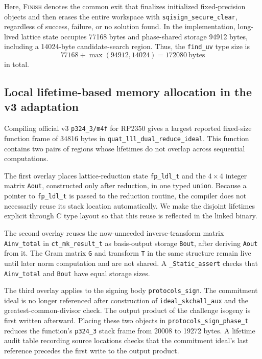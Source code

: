 \documentclass[a4paper,10pt]{article}
\theoremstyle{definition}
\theoremstyle{remark}
\begin{document}
Here, \textsc{Finish} denotes the common exit that finalizes initialized fixed-precision objects and then erases the entire workspace with \texttt{sqisign\_secure\_clear}, regardless of success, failure, or no solution found. In the implementation, long-lived lattice state occupies \num{77168} bytes and phase-shared storage \num{94912} bytes, including a \num{14024}-byte candidate-search region. Thus, the \texttt{find\_uv} type size is
\begin{equation}
  \num{77168}+\max(\num{94912},\num{14024})
  =\num{172080}\ \text{bytes}
  \label{eq:finduv-size}
\end{equation}
in total.

\subsection{Local lifetime-based memory allocation in the v3 adaptation}
\label{sec:v3-method}

Compiling official v3 \texttt{p324\_3/m4f} for RP2350 gives a largest reported fixed-size function frame of \num{34816} bytes in \texttt{quat\_lll\_dual\_reduce\_ideal}. This function contains two pairs of regions whose lifetimes do not overlap across sequential computations.

The first overlay places lattice-reduction state \texttt{fp\_ldl\_t} and the $4\times4$ integer matrix \texttt{Aout}, constructed only after reduction, in one typed \texttt{union}. Because a pointer to \texttt{fp\_ldl\_t} is passed to the reduction routine, the compiler does not necessarily reuse its stack location automatically. We make the disjoint lifetimes explicit through C type layout so that this reuse is reflected in the linked binary.

The second overlay reuses the now-unneeded inverse-transform matrix \texttt{Ainv\_total} in \texttt{ct\_mk\_result\_t} as basis-output storage \texttt{Bout}, after deriving \texttt{Aout} from it. The Gram matrix \texttt{G} and transform \texttt{T} in the same structure remain live until later norm computation and are not shared. A \texttt{\_Static\_assert} checks that \texttt{Ainv\_total} and \texttt{Bout} have equal storage sizes.

The third overlay applies to the signing body \texttt{protocols\_sign}. The commitment ideal is no longer referenced after construction of \texttt{ideal\_skchall\_aux} and the greatest-common-divisor check. The output product of the challenge isogeny is first written afterward. Placing these two objects in \texttt{protocols\_sign\_phase\_t} reduces the function's \texttt{p324\_3} stack frame from \num{20008} to \num{19272} bytes. A lifetime audit table recording source locations checks that the commitment ideal's last reference precedes the first write to the output product.
\end{document}
